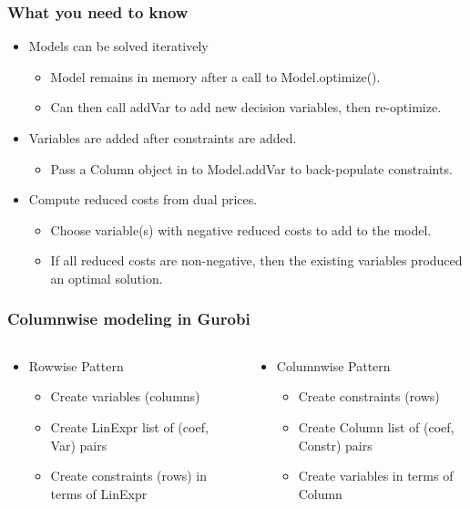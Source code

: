 \documentclass[12pt,handout]{beamer}
\begin{document}
\begin{frame}
\frametitle {What you need to know}
\begin{itemize}
\item Models can be solved iteratively
	\begin{itemize}
	\item Model remains in memory after a call to Model.optimize().
	\item Can then call addVar to add new decision variables, then re-optimize.
	\end{itemize}
\item Variables are added after constraints are added.
     \begin{itemize}
     \item Pass a Column object in to Model.addVar to back-populate constraints.
     \end{itemize}
\item Compute reduced costs from dual prices.
     \begin{itemize}
     \item Choose variable(s) with negative reduced costs to add to the model.
     \item If all reduced costs are non-negative, then the existing variables produced an optimal solution.
     \end{itemize}
\end{itemize}
\end{frame}

\begin{frame}
\frametitle {Columnwise modeling in Gurobi}
\begin{columns}

\begin{column}{0.5\textwidth}
\begin{itemize}
  \item Rowwise Pattern
  \begin{itemize}
    \item Create variables (columns)
    \item Create LinExpr list of (coef, Var) pairs
    \item Create constraints (rows) in terms of LinExpr
  \end{itemize}
\end{itemize}
\end{column}

\begin{column}{0.5\textwidth} 
\begin{itemize}
  \item Columnwise Pattern
  \begin{itemize}
    \item Create constraints (rows)
    \item Create Column list of (coef, Constr) pairs
    \item Create variables in terms of Column
  \end{itemize}
\end{itemize}
\end{column}

\end{columns}
\end{frame}
\end{document}

